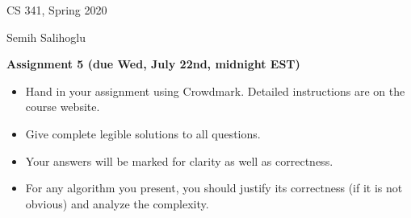 \documentclass[11pt]{article}
\begin{document}
\hfill CS 341, Spring 2020\par
\hfill Semih Salihoglu

\bigskip
\begin{center}\large\bf Assignment 5 (due Wed, July 22nd, midnight EST)
\end{center}

\begin{itemize}
\item Hand in your assignment using Crowdmark. Detailed instructions are on the course website.
\item Give complete legible solutions to all questions.
\item Your answers will be marked for clarity as well as correctness.
\item For any algorithm you present, you should justify its correctness
(if it is not obvious) and analyze the complexity.
\end{itemize}
\end{document}
